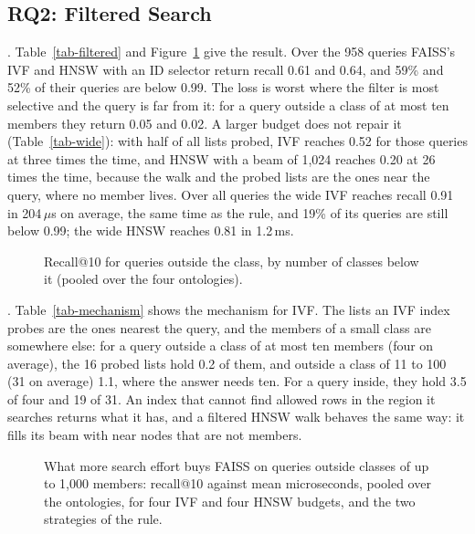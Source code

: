 \subsection{RQ2: Filtered Search}



.
Table~\ref{tab-filtered} and Figure~\ref{fig-recall} give the result.
Over the 958 queries FAISS's IVF and HNSW with an ID selector return recall 0.61 and 0.64,
and 59\% and 52\% of their queries are below 0.99.
The loss is worst where the filter is most selective and the query is far from it: for
a query outside a class of at most ten members they return 0.05 and 0.02.
A larger budget does not repair it (Table~\ref{tab-wide}): with half of all lists probed,
IVF reaches 0.52 for those queries at three times the time, and HNSW with a beam of 1,024
reaches 0.20 at 26 times the time, because the walk and the probed lists are the ones
near the query, where no member lives.
Over all queries the wide IVF reaches recall 0.91 in 204\,$\mu$s on average, the same time as
the rule, and 19\% of its queries are still below 0.99; the wide HNSW reaches 0.81 in 1.2\,ms.

\begin{figure}[t]
\centering

\caption{Recall@10 for queries outside the class, by number of classes below it (pooled over the four ontologies).}
\label{fig-recall}
\end{figure}



.
Table~\ref{tab-mechanism} shows the mechanism for IVF.
The lists an IVF index probes are the ones nearest the query, and the members of a small
class are somewhere else: for a query outside a class of at most ten members (four on
average), the 16 probed lists hold 0.2 of them, and outside a class of 11 to 100 (31 on
average) 1.1, where the answer needs ten.
For a query inside, they hold 3.5 of four and 19 of 31.
An index that cannot find allowed rows in the region it searches returns what it has,
and a filtered HNSW walk behaves the same way: it fills its beam with near nodes that are
not members.



\begin{figure}[t]
\centering

\caption{What more search effort buys FAISS on queries outside classes of up to 1,000 members: recall@10 against mean microseconds, pooled over the ontologies, for four IVF and four HNSW budgets, and the two strategies of the rule.}
\label{fig-budget}
\end{figure}

